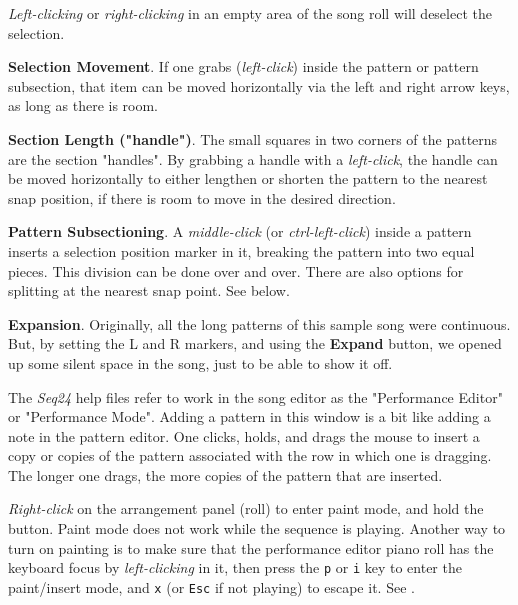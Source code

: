 \begin{enumber}
         \textsl{Left-clicking} or \textsl{right-clicking} in
         an empty area of the song roll
         will deselect the selection.
      \item \textbf{Selection Movement}.
         If one grabs (\textsl{left-click}) inside
         the pattern or pattern subsection, that item can be moved
         horizontally via the left and right arrow keys,
         as long as there is room.
      \item \textbf{Section Length ("handle")}.
         The small squares in two corners of the patterns are the section
         "handles".
         By grabbing a handle with a \textsl{left-click},
         the handle can be moved
         horizontally to either lengthen or shorten the pattern to the nearest
         snap position, if there is room to move in the desired direction.
      \item \textbf{Pattern Subsectioning}.
         A \textsl{middle-click} (or \textsl{ctrl-left-click})
         inside a pattern inserts a selection position
         marker in it, breaking the pattern into two equal pieces.
         This division can be done over and over.
         There are also options for splitting at the nearest snap point.
         See below.
      \item \textbf{Expansion}.
         Originally, all the long patterns of this sample song were continuous.
         But, by setting the L and R markers, and using the \textbf{Expand}
         button, we opened up some silent space in the song, just to be able
         to show it off.
   \end{enumber}

   The \textsl{Seq24} help files refer to work in the song editor as the
   "Performance Editor" or "Performance Mode".  Adding a pattern in this
   window is a bit like adding a note in the pattern editor.
   One clicks, holds, and drags the mouse to insert a copy or copies of the
   pattern associated with the row in which one is dragging.
   The longer one drags, the more copies of the pattern that are inserted.

   \textsl{Right-click} on the arrangement panel (roll) to enter
   paint mode, and hold the button.
   Paint mode does not work while the sequence is playing.
   Another way to turn on painting is to
   make sure that the performance editor piano roll has the
   keyboard focus by \textsl{left-clicking} in it, then press the
   \texttt{p} or \texttt{i} key to enter the paint/insert mode, and
   \texttt{x} (or \texttt{Esc} if not playing) to escape it.
   See .

